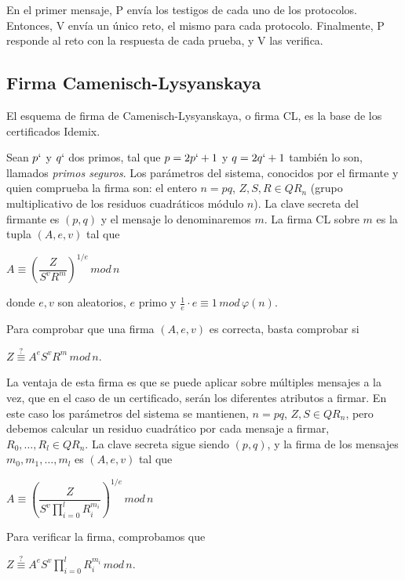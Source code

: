 En el primer mensaje, P envía los testigos de cada uno de los protocolos. Entonces, V envía un único reto, el mismo para cada protocolo. Finalmente, P responde al reto con la respuesta de cada prueba, y V las verifica.



\subsection{Firma Camenisch-Lysyanskaya}

El esquema de firma de Camenisch-Lysyanskaya, o firma CL, es la base de los certificados Idemix. 

Sean $p`$ y $q`$ dos primos, tal que $p=2p`+1$ y $q=2q`+1$ también lo son, llamados \textit{primos seguros}. Los parámetros del sistema, conocidos por el firmante y quien comprueba la firma son: el entero $n=pq$, $Z,S,R\in QR_n$ (grupo multiplicativo de los residuos cuadráticos módulo $n$). La clave secreta del firmante es $(p,q)$ y el mensaje lo denominaremos $m$. La firma CL sobre $m$ es la tupla $(A,e,v)$ tal que
\begin{center}
	$A \equiv \left( \dfrac{Z}{S^v R^m} \right) ^{1/e} \, mod \, n$
\end{center}
donde $e,v$ son aleatorios, $e$ primo y $\frac{1}{e}\cdot e \equiv 1 \, mod \, \varphi(n)$.


Para comprobar que una firma $(A,e,v)$ es correcta, basta comprobar si
\begin{center}
	$Z \overset{?}{\equiv} A^e S^v R^m \, mod \, n$.
\end{center}

\hfil

La ventaja de esta firma es que se puede aplicar sobre múltiples mensajes a la vez, que en el caso de un certificado, serán los diferentes atributos a firmar. En este caso los parámetros del sistema se mantienen, $n=pq$, $Z,S\in QR_n$, pero debemos calcular un residuo cuadrático por cada mensaje a firmar, $R_0,\dots,R_l\in QR_n$. La clave secreta sigue siendo $(p,q)$, y la firma de los mensajes $m_0,m_1,\dots,m_l$ es $(A,e,v)$ tal que
\begin{center}
	$A \equiv \left( \dfrac{Z}{S^v \prod_{i=0}^{l} R_i^{m_i} } \right) ^{1/e} \, mod \, n$
\end{center}

\hfil

Para verificar la firma, comprobamos que
\begin{center}
	$Z \overset{?}{\equiv} A^e S^v \prod_{i=0}^{l} R_i^{m_i} \, mod \, n$.
\end{center}


